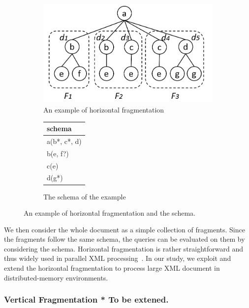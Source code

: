 \begin{figure}[t]
	\centering
	\begin{subfigure}{.6\textwidth}
		\centering
		\includegraphics[width=.99\linewidth]{figures/hfrag_example}
		\caption{An example of horizontal fragmentation}
		\label{fig:sub1}
	\end{subfigure}%
	\begin{subfigure}{.4\textwidth}
		\centering
		\vspace{12mm}
		\begin{tabular}{|l|}
			\hline
			schema\\
			\hline
			a(b*, c*, d) \\
			b(e, f?) \\
			c(e) \\
			d(g*) \\
			\hline
		\end{tabular}
		\vspace{12mm}
		\caption{The schema of the example}
		\label{fig:sub2}
	\end{subfigure}
	\caption{An example of horizontal fragmentation and the schema.}
	\label{fig:hfrag_example}
\end{figure}

We then consider the whole document as a simple collection of fragments. Since
the fragments follow the same schema, the queries can be evaluated on them by
considering the schema. Horizontal fragmentation is rather straightforward and
thus widely used in parallel XML processing~\cite{DaGP14,BoLS09,AfDG15,CCMN15}.
In our study, we exploit and extend the horizontal fragmentation to process
large  XML document in distributed-memory environments.

\subsubsection{Vertical Fragmentation * To be extened.} \label{sec:vfragment}


